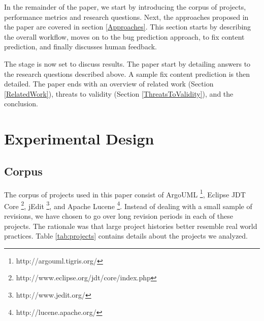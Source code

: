 \documentclass[10pt, conference, letterpaper, compsocconf]{IEEEtran}
\begin{document}
In the remainder of the paper, we start by introducing the corpus of projects, performance metrics and research questions. Next, the approaches proposed in the paper are covered in section \ref{Approaches}. This section starts by describing the overall workflow, moves
on to the bug prediction approach, to fix content prediction, and
finally discusses human feedback.

The stage is now set to discuss results. The paper start by detailing answers to the research questions
described above. A sample fix content prediction is then detailed. 
The paper ends with an overview of related work (Section \ref{RelatedWork}),
threats to validity (Section \ref{ThreatsToValidity}), and the conclusion.

\section{Experimental Design}
\subsection{Corpus}
\label{Corpus}
The corpus of projects used in this paper
consist of ArgoUML%
\footnote{http://argouml.tigris.org/%
}, Eclipse JDT Core%
\footnote{http://www.eclipse.org/jdt/core/index.php%
}, jEdit%
\footnote{http://www.jedit.org/%
}, and Apache Lucene%
\footnote{http://lucene.apache.org/%
}. Instead of dealing with a small sample of revisions, we have chosen
to go over long revision periods in each of these projects. The rationale
was that large project histories better resemble real world practices.
Table \ref{tab:projects} contains details about the projects we analyzed.
\end{document}

